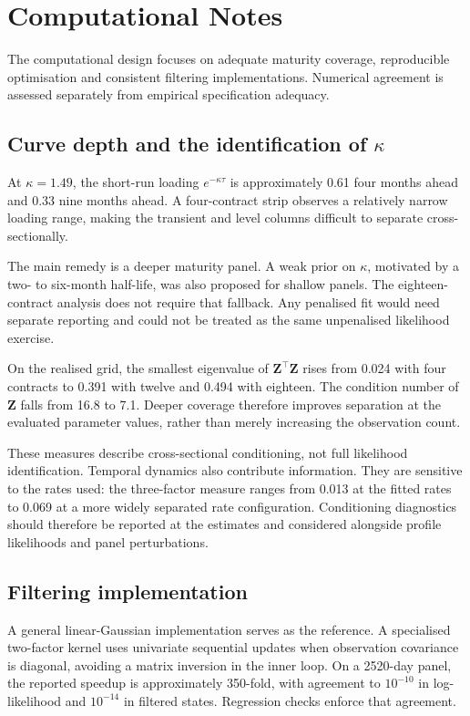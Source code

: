 \documentclass[journal]{IEEEtran}
\begin{document}
\section{Computational Notes}
\label{sec:computational}

The computational design focuses on adequate maturity coverage, reproducible optimisation and consistent filtering implementations. Numerical agreement is assessed separately from empirical specification adequacy.

\subsection{Curve depth and the identification of $\kappa$}
\label{sec:kappa}

At $\kappa=1.49$, the short-run loading $e^{-\kappa\tau}$ is approximately 0.61 four months ahead and 0.33 nine months ahead. A four-contract strip observes a relatively narrow loading range, making the transient and level columns difficult to separate cross-sectionally.

The main remedy is a deeper maturity panel. A weak prior on $\kappa$, motivated by a two- to six-month half-life, was also proposed for shallow panels. The eighteen-contract analysis does not require that fallback. Any penalised fit would need separate reporting and could not be treated as the same unpenalised likelihood exercise.

On the realised grid, the smallest eigenvalue of $\bm{Z}^{\!\top}\bm{Z}$ rises from 0.024 with four contracts to 0.391 with twelve and 0.494 with eighteen. The condition number of $\bm{Z}$ falls from 16.8 to 7.1. Deeper coverage therefore improves separation at the evaluated parameter values, rather than merely increasing the observation count.

These measures describe cross-sectional conditioning, not full likelihood identification. Temporal dynamics also contribute information. They are sensitive to the rates used: the three-factor measure ranges from 0.013 at the fitted rates to 0.069 at a more widely separated rate configuration. Conditioning diagnostics should therefore be reported at the estimates and considered alongside profile likelihoods and panel perturbations.

\subsection{Filtering implementation}

A general linear-Gaussian implementation serves as the reference. A specialised two-factor kernel uses univariate sequential updates when observation covariance is diagonal, avoiding a matrix inversion in the inner loop. On a 2520-day panel, the reported speedup is approximately 350-fold, with agreement to $10^{-10}$ in log-likelihood and $10^{-14}$ in filtered states. Regression checks enforce that agreement.
\end{document}
